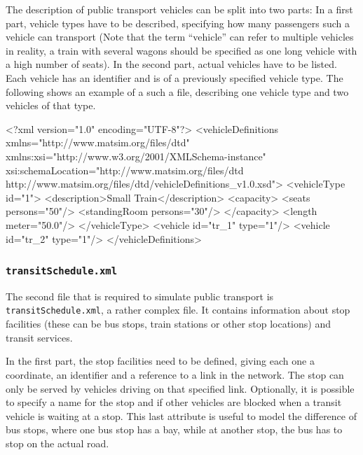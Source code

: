 The description of public transport vehicles can be split into two parts: In a first part, vehicle types have to be described, specifying how many passengers such a vehicle can transport (Note that the term ``vehicle'' can refer to multiple vehicles in reality, \eg a train with several wagons should be specified as one long vehicle with a high number of seats). In the second part, actual vehicles have to be listed. Each vehicle has an identifier and is of a previously specified vehicle type. The following shows an example of a such a file, describing one vehicle type and two vehicles of that type. 

\begin{xml}
<?xml version="1.0" encoding="UTF-8"?> 
<vehicleDefinitions xmlns="http://www.matsim.org/files/dtd" 
       xmlns:xsi="http://www.w3.org/2001/XMLSchema-instance" 
       xsi:schemaLocation="http://www.matsim.org/files/dtd http://www.matsim.org/files/dtd/vehicleDefinitions_v1.0.xsd"> 
	<vehicleType id="1"> 
      <description>Small Train</description> 
      <capacity> 
         <seats persons="50"/> 
         <standingRoom persons="30"/> 
      </capacity> 
      <length meter="50.0"/> 
   </vehicleType> 
   <vehicle id="tr_1" type="1"/> 
   <vehicle id="tr_2" type="1"/> 
</vehicleDefinitions>
\end{xml}

\subsubsection{\lstinline|transitSchedule.xml|}
\label{sec:inputdata:transitschedule}
The second file that is required to simulate public transport is \lstinline|transitSchedule.xml|, a rather complex file. It contains information about stop facilities (these can be bus stops, train stations or other stop locations) and transit services.

In the first part, the stop facilities need to be defined, giving each one a coordinate, an identifier and a reference to a link in the network. The stop can only be served by vehicles driving on that specified link. Optionally, it is possible to specify a name for the stop and if other vehicles are blocked when a transit vehicle is waiting at a stop. This last attribute is useful to model \eg the difference of bus stops, where one bus stop has a bay, while at another stop, the bus has to stop on the actual road.

